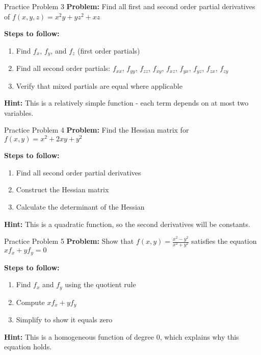 \documentclass[aspectratio=169]{beamer}
\begin{document}
\begin{frame}{Practice Problem 3}
\textbf{Problem:} Find all first and second order partial derivatives of $f(x,y,z) = x^2y + yz^2 + xz$

\textbf{Steps to follow:}
\begin{enumerate}
    \item Find $f_x$, $f_y$, and $f_z$ (first order partials)
    \item Find all second order partials: $f_{xx}$, $f_{yy}$, $f_{zz}$, $f_{xy}$, $f_{xz}$, $f_{yx}$, $f_{yz}$, $f_{zx}$, $f_{zy}$
    \item Verify that mixed partials are equal where applicable
\end{enumerate}

\textbf{Hint:} This is a relatively simple function - each term depends on at most two variables.
\end{frame}

\begin{frame}{Practice Problem 4}
\textbf{Problem:} Find the Hessian matrix for $f(x,y) = x^2 + 2xy + y^2$

\textbf{Steps to follow:}
\begin{enumerate}
    \item Find all second order partial derivatives
    \item Construct the Hessian matrix
    \item Calculate the determinant of the Hessian
\end{enumerate}

\textbf{Hint:} This is a quadratic function, so the second derivatives will be constants.
\end{frame}

\begin{frame}{Practice Problem 5}
\textbf{Problem:} Show that $f(x,y) = \frac{x^2 - y^2}{x^2 + y^2}$ satisfies the equation $xf_x + yf_y = 0$

\textbf{Steps to follow:}
\begin{enumerate}
    \item Find $f_x$ and $f_y$ using the quotient rule
    \item Compute $xf_x + yf_y$
    \item Simplify to show it equals zero
\end{enumerate}

\textbf{Hint:} This is a homogeneous function of degree 0, which explains why this equation holds.
\end{frame}
\end{document}
